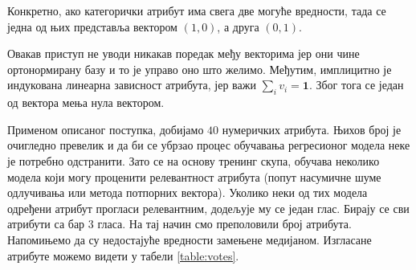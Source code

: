 \documentclass[12pt, a4paper]{article}
\begin{document}
		Конкретно, ако категорички атрибут има свега две могуће вредности, тада се једна од њих представља вектором $(1, 0)$, а друга $(0, 1)$.
	
		Овакав приступ не уводи никакав поредак међу векторима јер они чине ортонормирану базу и то је управо оно што желимо. Међутим, имплицитно је индукована линеарна зависност атрибута, јер важи $\sum_{i} v_i = \textbf{1}$. Због тога се један од вектора мења нула вектором.
	
		Применом описаног поступка, добијамо $40$ нумеричких атрибута. Њихов број је очигледно превелик и да би се убрзао процес обучавања регресионог модела неке је потребно одстранити. Зато се на основу тренинг скупа, обучава неколико модела који могу проценити релевантност атрибута (попут насумичне шуме одлучивања или метода потпорних вектора). Уколико неки од тих модела одређени атрибут прогласи релевантним, додељује му се један глас. Бирају се сви атрибути са бар $3$ гласа. На тај начин смо преполовили број атрибута. Напомињемо да су недостајуће вредности замењене медијаном. Изгласане атрибуте можемо видети у табели \ref{table:votes}.
\end{document}
